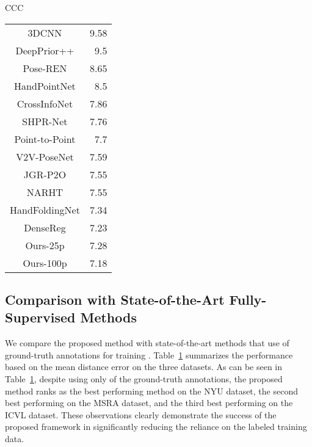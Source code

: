 \documentclass{article}
\begin{document}
\begin{table}[!h]
\begin{tabularx}{\columnwidth}{CCC}
{\begin{tabular}{cr}
             3DCNN \cite{ge20173d}             &         9.58 \\
  DeepPrior++ \cite{oberweger2017deepprior++}  &         9.5  \\
         Pose-REN \cite{chen2020pose}          &         8.65 \\
        HandPointNet \cite{ge2018hand}         &         8.5  \\
    CrossInfoNet \cite{du2019crossinfonet}     &         7.86 \\
         SHPR-Net \cite{chen2018shpr}          &         7.76 \\
       Point-to-Point \cite{ge2018point}       &         7.7  \\
        V2V-PoseNet \cite{moon2018v2v}         &         7.59 \\
          JGR-P2O \cite{fang2020jgr}           &         7.55 \\
          NARHT \cite{huang2020hand}           &         7.55 \\
 HandFoldingNet \cite{cheng2021handfoldingnet} &         7.34 \\
         DenseReg \cite{wan2018dense}          &         7.23 \\
Ours-25p                                      &          7.28 \\
 Ours-100p                                     &        7.18 \\
\hline
\end{tabular}
}

\end{tabularx}
\label{tab:comprehensive}
\end{table}
\subsection{Comparison with State-of-the-Art Fully-Supervised Methods}
We compare the proposed method with state-of-the-art methods that use  of ground-truth annotations for training \cite{zhou2016model,oberweger2015hands,oberweger2017deepprior++,guo2017region,wang2018region,chen2020pose,oberweger2019generalized,wan2018dense,xiong2019a2j,du2019crossinfonet,fang2020jgr,ge20173d,chen2018shpr,ge2018hand,ge2018point,huang2020hand,cheng2021handfoldingnet,moon2018v2v}.
 Table~\ref{tab:comprehensive} summarizes the performance based on the mean distance error on the three datasets. As can be seen in Table~\ref{tab:comprehensive}, despite using only  of the ground-truth annotations, the proposed method ranks as the best performing method on the NYU dataset, the second best performing on the MSRA dataset, and the third best performing on the ICVL dataset. These observations clearly demonstrate the success of the proposed framework in significantly reducing the reliance on the labeled training data. 
\end{document}

